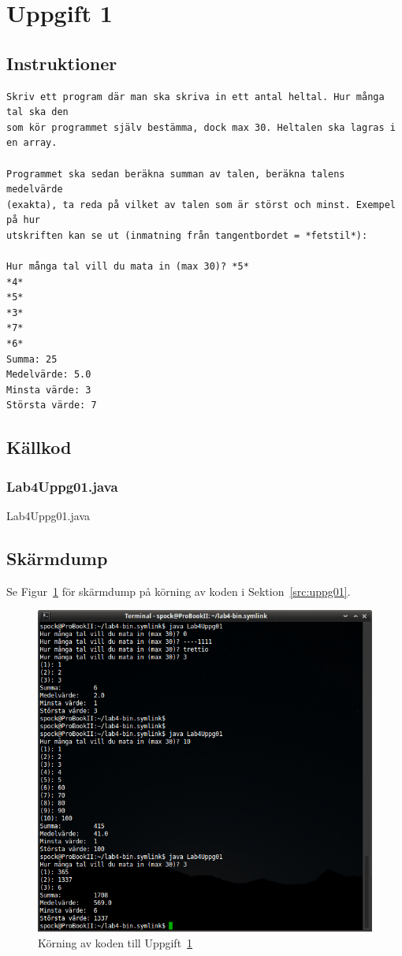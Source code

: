 \section{Uppgift 1}\label{sec:uppg01}

\subsection{Instruktioner}
\begin{Verbatim}[fontsize=\small]
Skriv ett program där man ska skriva in ett antal heltal. Hur många tal ska den
som kör programmet själv bestämma, dock max 30. Heltalen ska lagras i en array.

Programmet ska sedan beräkna summan av talen, beräkna talens medelvärde
(exakta), ta reda på vilket av talen som är störst och minst. Exempel på hur
utskriften kan se ut (inmatning från tangentbordet = *fetstil*):

Hur många tal vill du mata in (max 30)? *5*
*4*
*5*
*3*
*7*
*6*
Summa: 25
Medelvärde: 5.0
Minsta värde: 3
Största värde: 7
\end{Verbatim}


\subsection{Källkod}
\subsubsection{Lab4Uppg01.java}
\caption{Lab4Uppg01.java}
\label{src:uppg01}

\subsection{Skärmdump}
Se Figur~\ref{fig:uppg01-screenshot} för skärmdump på körning av koden i
Sektion~\ref{src:uppg01}.

\begin{figure}[htbp]
\centering
\includegraphics[width=\linewidth]{img/01.png}
\caption{Körning av koden till Uppgift~\ref{sec:uppg01}}
\label{fig:uppg01-screenshot}
\end{figure}

